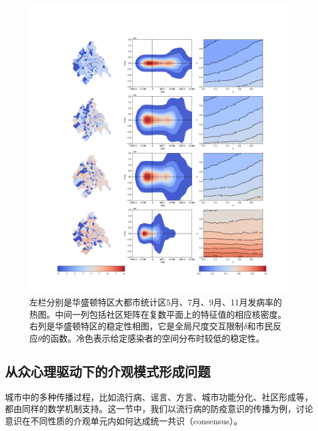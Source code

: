 \begin{figure}[h]
    \centering
    \includegraphics[width = 0.9\linewidth]{Figs/Figure3.png}
    \caption{左栏分别是华盛顿特区大都市统计区5月、7月、9月、11月发病率的热图。中间一列包括社区矩阵在复数平面上的特征值的相应核密度。右列是华盛顿特区的稳定性相图，它是全局尺度交互限制$\delta$和市民反应$\theta$的函数。冷色表示给定感染者的空间分布时较低的稳定性。}
    \label{fig:allee3}
\end{figure}

\subsection{从众心理驱动下的介观模式形成问题}




城市中的多种传播过程，比如流行病、谣言、方言、城市功能分化、社区形成等，都由同样的数学机制支持\cite{gao2019effects, ribeiro2020city}。这一节中，我们以流行病的防疫意识的传播为例，讨论意识在不同性质的介观单元内如何达成统一共识（consensus）。

